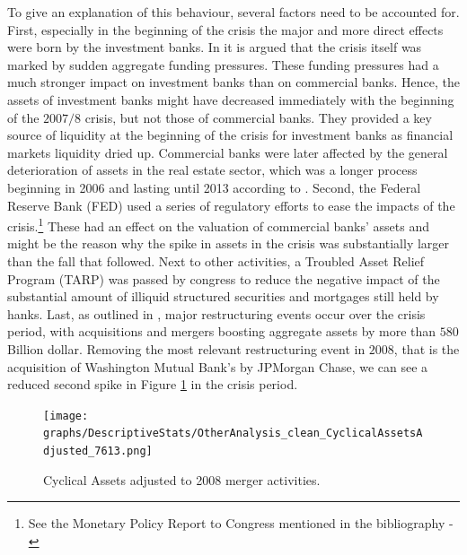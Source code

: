 \documentclass[12pt, a4paper]{article} %
\begin{document}

To give an explanation of this behaviour, several factors need to be accounted for. First, especially in the beginning of the crisis the major and more direct effects were born by the investment banks. In \citet{antoniades2019commercial} it is argued that the crisis itself was marked by sudden aggregate funding pressures. These funding pressures had a much stronger impact on investment banks than on commercial banks. Hence, the assets of investment banks might have decreased immediately with the beginning of the $2007/8$ crisis, but not those of commercial banks. They provided a key source of liquidity at the beginning of the crisis for investment banks as financial markets liquidity dried up. Commercial banks were later affected by the general deterioration of assets in the real estate sector, which was a longer process beginning in 2006 and lasting until 2013 according to \citet{antoniades2019commercial}.
Second, the Federal Reserve Bank (FED) used a series of regulatory efforts to ease the impacts of the crisis.\footnote{See the Monetary Policy Report to Congress mentioned in the bibliography - \citep{FEDReport}} These had an effect on the valuation of commercial banks' assets and might be the reason why the spike in assets in the crisis was substantially larger than the fall that followed. Next to other activities, a Troubled Asset Relief Program (TARP) was passed by congress to reduce the negative impact of the substantial amount of  illiquid  structured  securities  and  mortgages  still held  by  hanks. 
Last, as outlined in \citet{bech2009profits}, major restructuring events occur over the crisis period, with acquisitions and mergers boosting aggregate assets by more than $580$ Billion dollar. Removing the most relevant restructuring event in $2008$, that is the acquisition of  Washington Mutual  Bank's  by JPMorgan Chase, we can see a reduced second spike in Figure \ref{fig:cyclial_assets_adjusted} in the crisis period. 

\begin{figure}[H]
\begin{minipage}{\textwidth}
\texttt{[image: graphs/DescriptiveStats/OtherAnalysis\_clean\_CyclicalAssetsAdjusted\_7613.png]}
\caption[1]{Cyclical Assets adjusted to 2008 merger activities.}
\label{fig:cyclial_assets_adjusted}
\end{minipage}
\end{figure}
\end{document}

